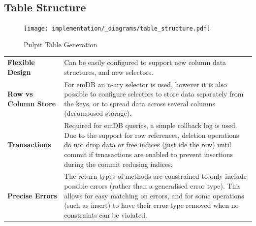\subsection{Table Structure}
\begin{figure}[h!]
    \centering
    \texttt{[image: implementation/\_diagrams/table\_structure.pdf]}
    \caption{Pulpit Table Generation}
\end{figure}
\begin{center}
    \begin{tabular}{l p{}}
        \textbf{Flexible Design}     & Can be easily configured to support new column data structures, and new selectors.                                                                                                                                                                                          \\
        \textbf{Row vs Column Store} & For emDB an n-ary selector is used, however it is also possible to configure selectors to store data separately from the keys, or to spread data across several columns (decomposed storage).                                                                               \\
        \textbf{Transactions}        & Required for emDB queries, a simple rollback log is used. Due to the support for row references, deletion operations do not drop data or free indices (just ide the row) until commit if trnasactions are enabled to prevent insertions during the commit redusing indices. \\
        \textbf{Precise Errors}      & The return types of methods are constrained to only include possible errors (rather than a generalised error type). This allows for easy matching on errors, and for some operations (such as insert) to have their error type removed when no constraints can be violated. \\
    \end{tabular}
\end{center}
